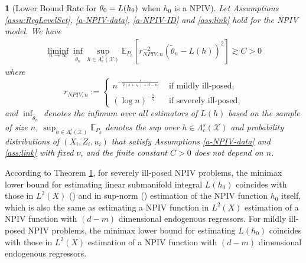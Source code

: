 \documentclass[12pt,american]{article}
\theoremstyle{definition}
\theoremstyle{plain}
\theoremstyle{definition}
\theoremstyle{plain}
\theoremstyle{plain}
\newtheorem{thm}{\protect\theoremname}
\theoremstyle{plain}
\theoremstyle{plain}
\theoremstyle{plain}
\newcommand{\E}{\mathbb{E}}
\providecommand{\theoremname}{Theorem}
\providecommand{\theoremname}{Theorem}
\begin{document}
\begin{thm}[Lower Bound Rate for $\theta_0=L(h_0)$ when $h_0$ is a NPIV]\label{thm:LB_NPIV}
  Let Assumptions \ref{assu:RegLevelSet}, \ref{a-NPIV-data}, \ref{a-NPIV-ID} and \ref{ass:link} hold for the NPIV model. We have
  \begin{align*}
    \liminf_{n \to \infty}  \inf_{\tilde{\theta}_n} \sup_{h \in \Lambda_c^s(\mathcal{X})} \E_{P_{h}} \left[r^{-2}_{NPIV,n} (\tilde{\theta}_n - L(h))^2 \right] \gtrsim  C>0
  \end{align*}
  where
  \begin{equation}
    r_{NPIV,n}  :=
    \begin{cases}
      n^{-\frac{s}{2(s+\varsigma) + d - m} }&  \text{ if mildly ill-posed,} \\
      (\log n)^{-\frac{s}{\varsigma}} &   \text{ if severely ill-posed,}
    \end{cases}
  \end{equation}
  and $\inf_{\tilde{\theta}_n}$ denotes the infimum over all estimators of $L(h)$ based on the sample of size $n$, $\sup_{h \in \Lambda_c^s(\mathcal{X})} \E_{P_{h}}$ denotes the sup over $h \in \Lambda_c^s(\mathcal{X})$  and probability distributions of $(X_i,Z_i,u_i)$ that satisfy Assumptions \ref{a-NPIV-data} and \ref{ass:link} with fixed $\nu$, and the finite constant $C>0$ does not depend on $n$.
\end{thm}

According to Theorem \ref{thm:LB_NPIV}, for severely ill-posed NPIV problems, the minimax lower bound for estimating linear submanifold integral $L(h_0)$ coincides with those in $L^2(X)$ (\cite{chen2011rate}) and in sup-norm (\cite{chen2018optimal}) estimation of the NPIV function $h_0$ itself, which is also the same as estimating a NPIV function in $L^2(X)$ estimation of a NPIV function with $(d-m)$ dimensional endogenous regressors.
For mildly ill-posed NPIV problems, the minimax lower bound for estimating $L(h_0)$ coincides with those in $L^2(X)$ estimation of a NPIV function with $(d-m)$ dimensional endogenous regressors.
\end{document}
